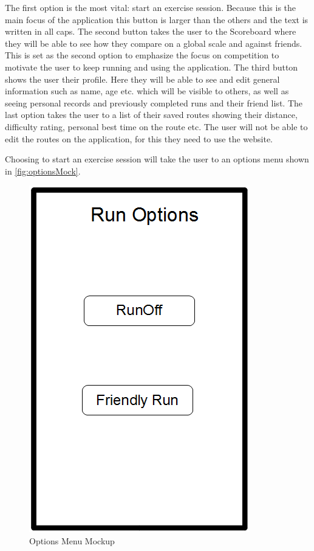 The first option is the most vital: start an exercise session. Because this is the main focus of the application this button is larger than the others and the text is written in all caps. The second button takes the user to the Scoreboard where they will be able to see how they compare on a global scale and against friends. This is set as the second option to emphasize the focus on competition to motivate the user to keep running and using the application. The third button shows the user their profile. Here they will be able to see and edit general information such as name, age etc. which will be visible to others, as well as seeing personal records and previously completed runs and their friend list. The last option takes the user to a list of their saved routes showing their distance, difficulty rating, personal best time on the route etc. The user will not be able to edit the routes on the application, for this they need to use the website.

Choosing to start an exercise session will take the user to an options menu shown in \autoref{fig:optionsMock}.

\begin{figure}[!ht]
	\begin{center}
		\includegraphics[scale=0.4]{img/optionsMock.png}
		\caption{Options Menu Mockup}
		\label{fig:optionsMock}
	\end{center}
\end{figure}

